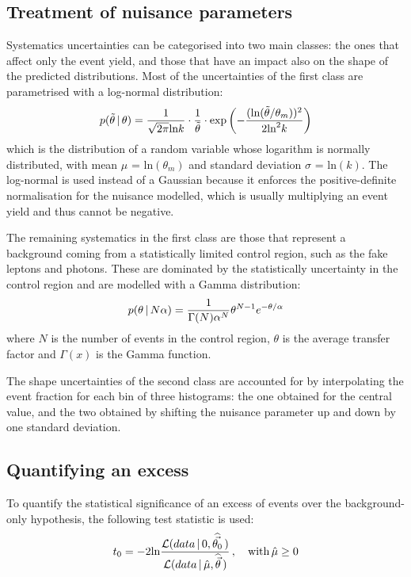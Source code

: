 \subsection{Treatment of nuisance parameters}
Systematics uncertainties can be categorised into two main classes: the ones that affect only the event yield, and those that have an impact also on the shape of the predicted distributions.
Most of the uncertainties of the first class are parametrised with a log-normal distribution:
\begin{equation}
  \label{eq:lnNdef}
  p(\tilde{\theta}\,|\,\theta) = \frac{1}{\sqrt{2 \pi} \text{ln} k} \cdot \frac{1}{\tilde{\theta}} \cdot \text{exp} \left( -\frac{(\text{ln}(\tilde{\theta}/\theta_m))^2}{2 \text{ln}^2 k} \right)
\end{equation}
which is the distribution of a random variable whose logarithm is normally distributed, with mean $\mu$ = $\text{ln}(\theta_m)$ and standard deviation $\sigma$ = $\text{ln}(k)$.
The log-normal is used instead of a Gaussian because it enforces the positive-definite normalisation for the nuisance modelled, which is usually multiplying an event yield and thus cannot be negative.

The remaining systematics in the first class are those that represent a background coming from a statistically limited control region, such as the fake leptons and photons.
These are dominated by the statistically uncertainty in the control region and are modelled with a Gamma distribution:
\begin{equation}
  \label{eq:gammadef}
  p(\theta\,|\,N\alpha) = \frac{1}{\Gamma(N) \alpha^N} \theta^{N-1} e^{-\theta/\alpha}
\end{equation}
where $N$ is the number of events in the control region, $\theta$ is the average transfer factor and $\Gamma(x)$ is the Gamma function.

The shape uncertainties of the second class are accounted for by interpolating the event fraction for each bin of three histograms: the one obtained for the central value, and the two obtained by shifting the nuisance parameter up and down by one standard deviation.

\subsection{Quantifying an excess}
To quantify the statistical significance of an excess of events over the background-only hypothesis, the following test statistic is used:
\begin{equation}
  \label{eq:test_statistic}
  t_0 = -2\text{ln} \frac {\mathcal{L}(data\,|\,0,\widehat{\vec{\theta_0}}\,)} {\mathcal{L}(data\,|\,\hat\mu,\widehat{\vec\theta}\,)}\,,\quad \text{with}\, \hat\mu \ge 0
\end{equation}

